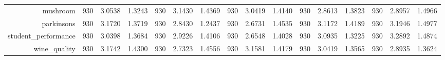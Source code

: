 \begin{table}[htbp]
{\begin{tabular}{rccccccccccccccc}
                  mushroom                            & 930                                 & 3.0538                                                                    & 1.3243          & 930                            & 3.1430                                                                             & 1.4369          & 930                             & 3.0419                                                                    & 1.4140          & 930                             & \cellcolor[rgb]{ .776,  .937,  .808}\textcolor[rgb]{ 0,  .38,  0}{2.8613} & 1.3823          & 930                             & 2.8957          & 1.4966          \\
                  parkinsons                          & 930                                 & 3.1720                                                                    & 1.3719          & 930                            & 2.8430                                                                             & 1.2437          & 930                             & \cellcolor[rgb]{ .776,  .937,  .808}\textcolor[rgb]{ 0,  .38,  0}{2.6731} & 1.4535          & 930                             & 3.1172                                                                    & 1.4189          & 930                             & 3.1946          & 1.4977          \\
                  student\_performance                & 930                                 & 3.0398                                                                    & 1.3684          & 930                            & 2.9226                                                                             & 1.4106          & 930                             & \cellcolor[rgb]{ .776,  .937,  .808}\textcolor[rgb]{ 0,  .38,  0}{2.6548} & 1.4028          & 930                             & 3.0935                                                                    & 1.3225          & 930                             & 3.2892          & 1.4874          \\
                  wine\_quality                       & 930                                 & 3.1742                                                                    & 1.4300          & 930                            & \cellcolor[rgb]{ .776,  .937,  .808}\textcolor[rgb]{ 0,  .38,  0}{2.7323}          & 1.4556          & 930                             & 3.1581                                                                    & 1.4179          & 930                             & 3.0419                                                                    & 1.3565          & 930                             & 2.8935          & 1.3624          \\

\end{tabular}}
\end{table}
